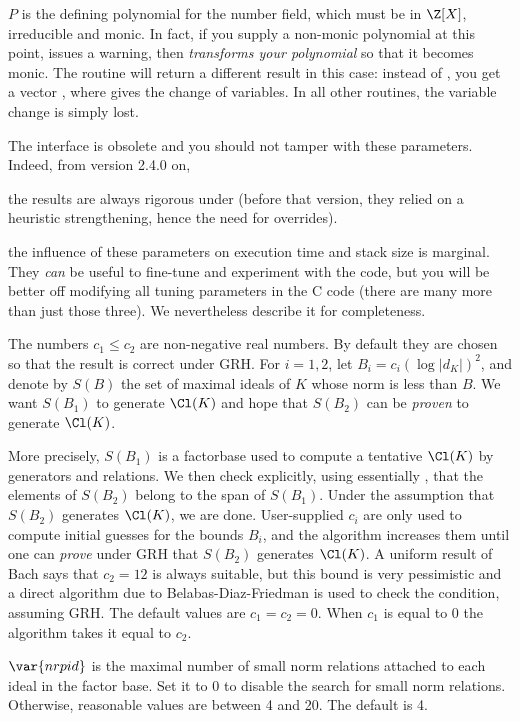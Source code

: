 $P$ is the defining polynomial for the number field, which must be in
$\Z[X]$, irreducible and monic. In fact, if you supply a non-monic polynomial
at this point,  issues a warning, then \emph{transforms your
polynomial} so that it becomes monic. The  routine
will return a different result in this case: instead of , you get a
vector , where  gives the change
of variables. In all other routines, the variable change is simply lost.

The  interface is obsolete and you should not tamper with
these parameters. Indeed, from version 2.4.0 on,

\item the results are always rigorous under  (before that version,
they relied on a heuristic strengthening, hence the need for overrides).

\item the influence of these parameters on execution time and stack size is
marginal. They \emph{can} be useful to fine-tune and experiment with the
 code, but you will be better off modifying all tuning
parameters in the C code (there are many more than just those three).
We nevertheless describe it for completeness.

The numbers $c_1 \leq c_2$ are non-negative real numbers. By default they are
chosen so that the result is correct under GRH. For $i = 1,2$, let
$B_i = c_i(\log |d_K|)^2$, and denote by $S(B)$ the set of maximal ideals of
$K$ whose norm is less than $B$. We want $S(B_1)$ to generate $\Cl(K)$ and hope
that $S(B_2)$ can be \emph{proven} to generate $\Cl(K)$.

More precisely, $S(B_1)$ is a factorbase used to compute a tentative
$\Cl(K)$ by generators and relations. We then check explicitly, using
essentially , that the elements of $S(B_2)$ belong to the
span of $S(B_1)$. Under the assumption that $S(B_2)$ generates $\Cl(K)$, we
are done. User-supplied $c_i$ are only used to compute initial guesses for
the bounds $B_i$, and the algorithm increases them until one can \emph{prove}
under GRH that $S(B_2)$ generates $\Cl(K)$. A uniform result of Bach says
that $c_2 = 12$ is always suitable, but this bound is very pessimistic and a
direct algorithm due to Belabas-Diaz-Friedman is used to check the condition,
assuming GRH. The default values are $c_1 = c_2 = 0$. When $c_1$ is equal to
$0$ the algorithm takes it equal to $c_2$.

$\var{nrpid}$ is the maximal number of small norm relations attached to each
ideal in the factor base. Set it to $0$ to disable the search for small norm
relations. Otherwise, reasonable values are between 4 and 20. The default is
4.

